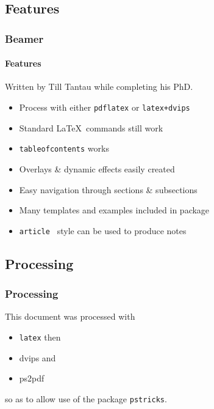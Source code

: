 \documentclass{beamer}
\begin{document}
\subsection{Features}
\begin{frame}
\frametitle{Beamer}
\framesubtitle{Features}
Written by Till Tantau while completing his PhD.
\begin{itemize}
\item Process with either \texttt{pdflatex} or \texttt{latex+dvips}\pause
\item Standard \LaTeX\ commands still work\pause
\item \texttt{tableofcontents} works \pause
\item Overlays \&  dynamic effects easily created\pause
\item Easy navigation through sections \&  subsections\pause
\item Many templates and examples included in package\pause
\item \texttt{article } style can be used to produce notes
\end{itemize}
\end{frame}

\subsection{Processing}
\begin{frame}[fragile]
 \frametitle{Processing}

This document was processed with
\begin{itemize}
\item {\blue\texttt{latex}} \pause then
\item {\blue dvips} \pause and
\item {\blue ps2pdf}
\end{itemize}
so as to allow use of the package {\blue\texttt{pstricks}}.



\end{frame}
\end{document}
